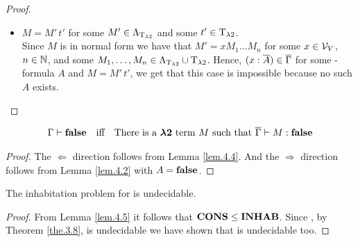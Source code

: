 \begin{proof}
\begin{itemize}
	\item[] \underline{$M=M'\,t'$} for some $M'\in\Lambda_{\text{T}_{\lambda2}}$ and some $t'\in\text{T}_{\lambda2}$.\\
		Since $M$ is in normal form we have that $M'=xM_1\dots M_n$ for some $x\in\mathcal{V}_V$, $n\in\mathbb{N}$, and some $M_1,\dots,M_n\in\Lambda_{\text{T}_{\lambda2}}\cup\text{T}_{\lambda2}$.
		Hence, $(x:\overline{A})\in\overline{\Gamma}$ for some \SysP-formula $A$ and $M=M'\,t'$, we get that this case is impossible because no such $A$ exists.
		
		
		
\end{itemize}
\end{proof}

\begin{lemma}\label{lem.4.5}
\begin{align*}
\Gamma\vdash\textbf{false}&&\text{iff}&&\text{There is a $\boldsymbol{\lambda2}$ term $M$ such that } \overline{\Gamma}\vdash M:\textbf{false}
\end{align*}
\end{lemma}
\begin{proof}
The $\Leftarrow$ direction follows from Lemma \ref{lem.4.4}. And the $\Rightarrow$ direction follows from Lemma \ref{lem.4.2} with $A=\textbf{false}$.
\end{proof}

\begin{theorem}\label{the.4.6}
The inhabitation problem for \lambdaTwo{} is undecidable.
\end{theorem}
\begin{proof}
From Lemma \ref{lem.4.5} it follows that $\textbf{CONS}\leq\textbf{INHAB}$. Since , by Theorem \ref{the.3.8}, \PCons{} is undecidable we have shown that \lambdaInhab{} is undecidable too.
\end{proof}